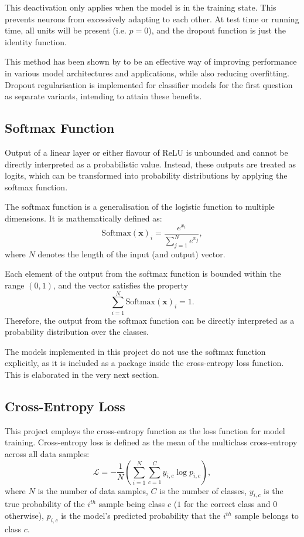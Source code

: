 \documentclass{l4proj}
\begin{document}
This deactivation only applies when the model is in the training state. This prevents neurons from excessively adapting to each other. At test time or running time, all units will be present (i.e. $p = 0$), and the dropout function is just the identity function. 

This method has been shown by \cite{srivastava2014} to be an effective way of improving performance in various model architectures and applications, while also reducing overfitting. Dropout regularisation is implemented for classifier models for the first question as separate variants, intending to attain these benefits.

\subsection{Softmax Function}
Output of a linear layer or either flavour of ReLU is unbounded and cannot be directly interpreted as a probabilistic value. Instead, these outputs are treated as logits, which can be transformed into probability distributions by applying the softmax function.

The softmax function is a generalisation of the logistic function to multiple dimensions. It is mathematically defined as:
\begin{equation}
    \text{Softmax}(\boldsymbol{x})_i = \frac{e^{x_i}}{\sum\limits^{N}_{j=1}e^{x_j}},
\end{equation}
where $N$ denotes the length of the input (and output) vector.

Each element of the output from the softmax function is bounded within the range $(0, 1)$, and the vector satisfies the property 
\begin{equation}
    \sum\limits_{i=1}^N \text{Softmax}(\boldsymbol{x})_i = 1.
\end{equation} 
Therefore, the output from the softmax function can be directly interpreted as a probability distribution over the classes.

The models implemented in this project do not use the softmax function explicitly, as it is included as a package inside the cross-entropy loss function. This is elaborated in the very next section.

\subsection{Cross-Entropy Loss}
This project employs the cross-entropy function as the loss function for model training. Cross-entropy loss is defined as the mean of the multiclass cross-entropy across all data samples:
\begin{equation}
    \mathcal{L} = -\frac{1}{N} \left( \sum_{i=1}^N \sum_{c=1}^C y_{i, c} \log p_{i, c} \right),
\end{equation}
where $N$ is the number of data samples, $C$ is the number of classes, $y_{i,c}$ is the true probability of the $i^{th}$ sample being class $c$ ($1$ for the correct class and $0$ otherwise), $p_{i,c}$ is the model's predicted probability that the $i^{th}$ sample belongs to class $c$.
\end{document}
